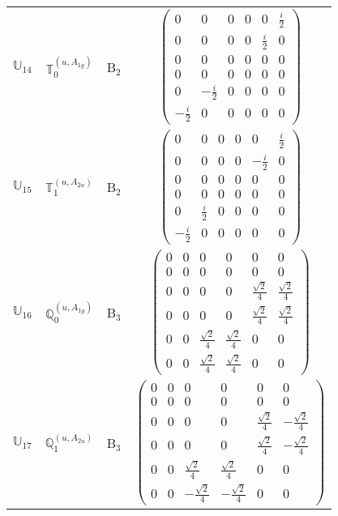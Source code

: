 \documentclass[fleqn,10pt,landscape]{article}
\begin{document}
\begin{itemize}
\begin{center}
\begin{longtable}{c|c|c|c}
$ \mathbb{U}_{14} $ & $\mathbb{T}_{0}^{(u,A_{1g})}$ & B$_{2}$ & $\begin{pmatrix} 0 & 0 & 0 & 0 & 0 & \frac{i}{2} \\ 0 & 0 & 0 & 0 & \frac{i}{2} & 0 \\ 0 & 0 & 0 & 0 & 0 & 0 \\ 0 & 0 & 0 & 0 & 0 & 0 \\ 0 & - \frac{i}{2} & 0 & 0 & 0 & 0 \\ - \frac{i}{2} & 0 & 0 & 0 & 0 & 0 \end{pmatrix}$ \\
$ \mathbb{U}_{15} $ & $\mathbb{T}_{1}^{(u,A_{2u})}$ & B$_{2}$ & $\begin{pmatrix} 0 & 0 & 0 & 0 & 0 & \frac{i}{2} \\ 0 & 0 & 0 & 0 & - \frac{i}{2} & 0 \\ 0 & 0 & 0 & 0 & 0 & 0 \\ 0 & 0 & 0 & 0 & 0 & 0 \\ 0 & \frac{i}{2} & 0 & 0 & 0 & 0 \\ - \frac{i}{2} & 0 & 0 & 0 & 0 & 0 \end{pmatrix}$ \\ \hline
$ \mathbb{U}_{16} $ & $\mathbb{Q}_{0}^{(u,A_{1g})}$ & B$_{3}$ & $\begin{pmatrix} 0 & 0 & 0 & 0 & 0 & 0 \\ 0 & 0 & 0 & 0 & 0 & 0 \\ 0 & 0 & 0 & 0 & \frac{\sqrt{2}}{4} & \frac{\sqrt{2}}{4} \\ 0 & 0 & 0 & 0 & \frac{\sqrt{2}}{4} & \frac{\sqrt{2}}{4} \\ 0 & 0 & \frac{\sqrt{2}}{4} & \frac{\sqrt{2}}{4} & 0 & 0 \\ 0 & 0 & \frac{\sqrt{2}}{4} & \frac{\sqrt{2}}{4} & 0 & 0 \end{pmatrix}$ \\
$ \mathbb{U}_{17} $ & $\mathbb{Q}_{1}^{(u,A_{2u})}$ & B$_{3}$ & $\begin{pmatrix} 0 & 0 & 0 & 0 & 0 & 0 \\ 0 & 0 & 0 & 0 & 0 & 0 \\ 0 & 0 & 0 & 0 & \frac{\sqrt{2}}{4} & - \frac{\sqrt{2}}{4} \\ 0 & 0 & 0 & 0 & \frac{\sqrt{2}}{4} & - \frac{\sqrt{2}}{4} \\ 0 & 0 & \frac{\sqrt{2}}{4} & \frac{\sqrt{2}}{4} & 0 & 0 \\ 0 & 0 & - \frac{\sqrt{2}}{4} & - \frac{\sqrt{2}}{4} & 0 & 0 \end{pmatrix}$ \\

\end{longtable}
\end{center}
\end{itemize}
\end{document}
